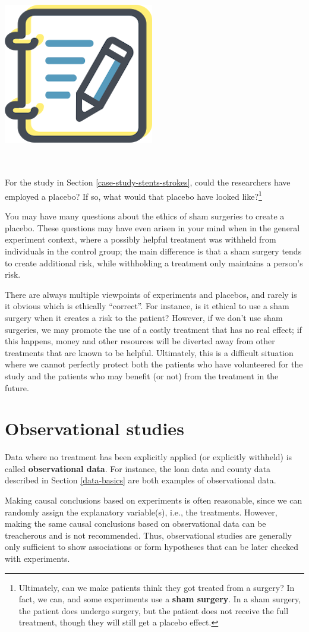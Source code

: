 \documentclass[
  10pt,
  openany]{book}
\newenvironment{mdframedwithfootGPWE}
{   
    \savenotes
    \begin{mdframed}[%
    topline=true, bottomline=true, linecolor=oiB, linewidth=0.5pt,
    rightline=false, leftline=false,
    backgroundcolor=oiLGray]
    \renewcommand{\thempfootnote}{\arabic{footnote}}
    }
{
    \end{mdframed}
    \spewnotes
}
\newenvironment{guidedpractice}{
\vspace{4mm}
\begin{mdframedwithfootGPWE}
\begin{minipage}[t]{0.10\textwidth}
{$\:$ \\ \setkeys{Gin}{width=2.5em,keepaspectratio}\includegraphics{images/_icons/guided-practice.png}}
\end{minipage}
\hfill
\begin{minipage}[t]{0.90\textwidth}
\vspace{-2mm}
\setlength{\parskip}{1em}
\noindent\textbf{\color{oiB}\small\fontfamily{phv}\selectfont{\MakeUppercase{Guided Practice}}} $\:$ \\ \\
}{\end{minipage}
\end{mdframedwithfootGPWE}
\vspace{4mm}
}
\begin{document}
\begin{guidedpractice}
For the study in Section \ref{case-study-stents-strokes}, could the researchers have employed a placebo?
If so, what would that placebo have looked like?\footnote{Ultimately, can we make patients think they got treated from a surgery?
  In fact, we can, and some experiments use a \textbf{sham surgery}.
  In a sham surgery, the patient does undergo surgery, but the patient does not receive the full treatment, though they will still get a placebo effect.}

\end{guidedpractice}

You may have many questions about the ethics of sham surgeries to create a placebo.
These questions may have even arisen in your mind when in the general experiment context, where a possibly helpful treatment was withheld from individuals in the control group; the main difference is that a sham surgery tends to create additional risk, while withholding a treatment only maintains a person's risk.

There are always multiple viewpoints of experiments and placebos, and rarely is it obvious which is ethically ``correct''.
For instance, is it ethical to use a sham surgery when it creates a risk to the patient?
However, if we don't use sham surgeries, we may promote the use of a costly treatment that has no real effect; if this happens, money and other resources will be diverted away from other treatments that are known to be helpful.
Ultimately, this is a difficult situation where we cannot perfectly protect both the patients who have volunteered for the study and the patients who may benefit (or not) from the treatment in the future.

\hypertarget{observational-studies}{%
\section{Observational studies}\label{observational-studies}}

Data where no treatment has been explicitly applied (or explicitly withheld) is called \textbf{observational data}.
For instance, the loan data and county data described in Section \ref{data-basics} are both examples of observational data.

Making causal conclusions based on experiments is often reasonable, since we can randomly assign the explanatory variable(s), i.e., the treatments.
However, making the same causal conclusions based on observational data can be treacherous and is not recommended.
Thus, observational studies are generally only sufficient to show associations or form hypotheses that can be later checked with experiments.
\end{document}

